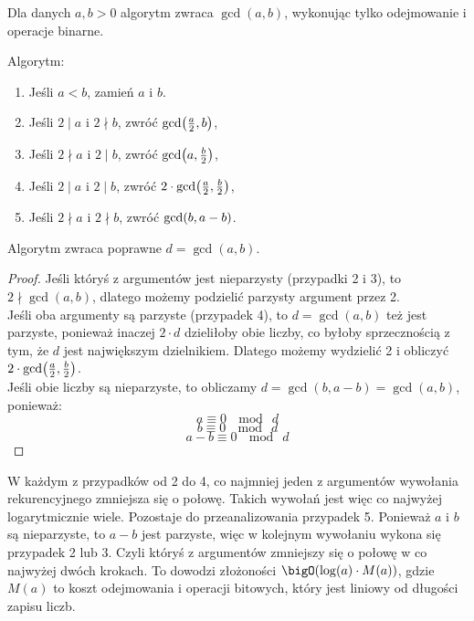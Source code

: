 Dla danych \( a,b > 0 \) algorytm zwraca \( \gcd(a,b) \), wykonując tylko odejmowanie i operacje binarne.

\begin{greyframe}
    Algorytm:
    \begin{enumerate}
    \item Jeśli \( a < b \), zamień \( a \) i \( b \).
    \item Jeśli \( 2 \mid a \) i \( 2 \nmid b \), zwróć \( \gcd\pars{\frac{a}{2}, b} \),
    \item Jeśli \( 2 \nmid a \) i \( 2 \mid b \), zwróć \( \gcd\pars{a, \frac{b}{2}} \),
    \item Jeśli \( 2 \mid a \) i \( 2 \mid b \), zwróć \( 2 \cdot \gcd\pars{\frac{a}{2}, \frac{b}{2}} \),
    \item Jeśli \( 2 \nmid a \) i \( 2 \nmid b \), zwróć \( \gcd\pars{b, a - b} \).
    \end{enumerate}
\end{greyframe}

\vspace{1em}\noindent
Algorytm zwraca poprawne \( d = \gcd(a, b) \).
\begin{proof}
    Jeśli któryś z argumentów jest nieparzysty (przypadki 2 i 3), to \( 2 \nmid \gcd(a, b) \), dlatego możemy podzielić parzysty argument przez 2. \\
    Jeśli oba argumenty są parzyste (przypadek 4), to \( d = \gcd(a, b) \) też jest parzyste, ponieważ inaczej \( 2 \cdot d \) dzieliłoby obie liczby, co byłoby sprzecznością z tym, że \( d \) jest największym dzielnikiem.
    Dlatego możemy wydzielić 2 i obliczyć \( 2 \cdot \gcd\pars{\frac{a}{2}, \frac{b}{2}} \). \\
    Jeśli obie liczby są nieparzyste, to obliczamy \( d = \gcd(b, a - b) = \gcd(a, b) \), ponieważ:
    \[
        a \equiv 0 \ \mod \ d
    \]
    \[
        b \equiv 0 \ \mod \ d
    \]
    \[
        a - b \equiv 0 \ \mod \ d
    \]
\end{proof}

W każdym z przypadków od 2 do 4, co najmniej jeden z argumentów wywołania rekurencyjnego zmniejsza się o połowę. Takich wywołań jest więc co najwyżej logarytmicznie wiele.
Pozostaje do przeanalizowania przypadek 5. Ponieważ \( a \) i \( b \) są nieparzyste, to \( a - b \) jest parzyste, więc w kolejnym wywołaniu wykona się przypadek 2 lub 3. Czyli któryś z argumentów zmniejszy się o połowę w co najwyżej dwóch krokach.
To dowodzi złożoności \( \bigO(\log(a) \cdot M(a)) \), gdzie \( M(a) \) to koszt odejmowania i operacji bitowych, który jest liniowy od długości zapisu liczb.